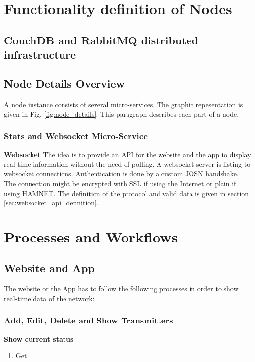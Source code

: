 \documentclass[a4paper]{article}
\begin{document}
\section{Functionality definition of Nodes}

\subsection{CouchDB and RabbitMQ distributed infrastructure}

\subsection{Node Details Overview}
A node instance consists of several micro-services. The graphic repesentation is given in Fig. \ref{fig:node_details}. This paragraph describes each part of a node.

\subsubsection{Stats and Websocket Micro-Service}

\textbf{Websocket}
The idea is to provide an API for the website and the app to display real-time information without the need of polling. A websocket server is listing to websocket connections. Authentication is done by a custom JOSN handshake. The connection might be encrypted with SSL if using the Internet or plain if using HAMNET. The definition of the protocol and valid data is given in section \ref{sec:websocket_api_definition}.

\section{Processes and Workflows}

\subsection{Website and App}
The website or the App has to follow the following processes in order to show real-time data of the network:

\subsubsection{Add, Edit, Delete and Show Transmitters}
\textbf{Show current status}
\begin{enumerate}
	\item Get 
\end{enumerate}
\end{document}
